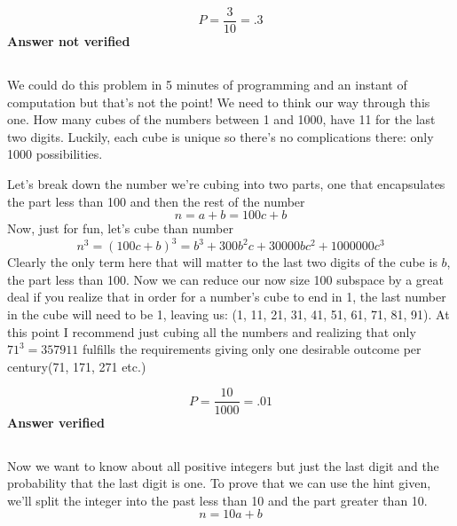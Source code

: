 \begin{equation}
	P=\frac{3}{10}=.3
\label{answer1.8}
\end{equation}
\textbf{Answer not verified}

\subsection{}

We could do this problem in 5 minutes of programming and an instant of computation but that's not the point!  We need to think our way through this one.  How many cubes of the numbers between 1 and 1000, have 11 for the last two digits.  Luckily, each cube is unique so there's no complications there: only 1000 possibilities.  

Let's break down the number we're cubing into two parts, one that encapsulates the part less than 100 and then the rest of the number
\begin{equation}
	n=a+b=100c+b
\end{equation}
Now, just for fun, let's cube than number
\begin{equation}
	n^3=(100c+b)^3=b^3+300 b^2 c+30000 b c^2+1000000 c^3
\end{equation}
Clearly the only term here that will matter to the last two digits of the cube is $b$, the part less than 100.  Now we can reduce our now size 100 subspace by a great deal if you realize that in order for a number's cube to end in 1, the last number in the cube will need to be 1, leaving us: (1, 11, 21, 31, 41, 51, 61, 71, 81, 91).  At this point I recommend just cubing all the numbers and realizing that only $71^3=357911$ fulfills the requirements giving only one desirable outcome per century(71, 171, 271 etc.)

\begin{equation}
	P=\frac{10}{1000}=.01
\label{answer1.9}
\end{equation}
\textbf{Answer verified}

\subsection{}
Now we want to know about all positive integers but just the last digit and the probability that the last digit is one.  To prove that we can use the hint given, we'll split the integer into the past less than 10 and the part greater than 10.
\begin{equation}
	n=10a+b
\end{equation}
